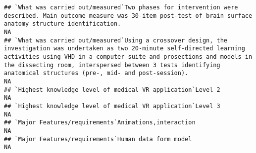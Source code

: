 \documentclass[]{article}
\begin{document}
\begin{verbatim}
## `What was carried out/measured`Two phases for intervention were described. Main outcome measure was 30-item post-test of brain surface anatomy structure identification.                                                                                                                                                                                                                                                                                                                NA
## `What was carried out/measured`Using a crossover design, the investigation was undertaken as two 20-minute self-directed learning activities using VHD in a computer suite and prosections and models in the dissecting room, interspersed between 3 tests identifying anatomical structures (pre-, mid- and post-session).                                                                                                                                                             NA
## `Highest knowledge level of medical VR application`Level 2                                                                                                                                                                                                                                                                                                                                                                                                                              NA
## `Highest knowledge level of medical VR application`Level 3                                                                                                                                                                                                                                                                                                                                                                                                                              NA
## `Major Features/requirements`Animations,interaction                                                                                                                                                                                                                                                                                                                                                                                                                                     NA
## `Major Features/requirements`Human data form model                                                                                                                                                                                                                                                                                                                                                                                                                                      NA

\end{verbatim}
\end{document}
